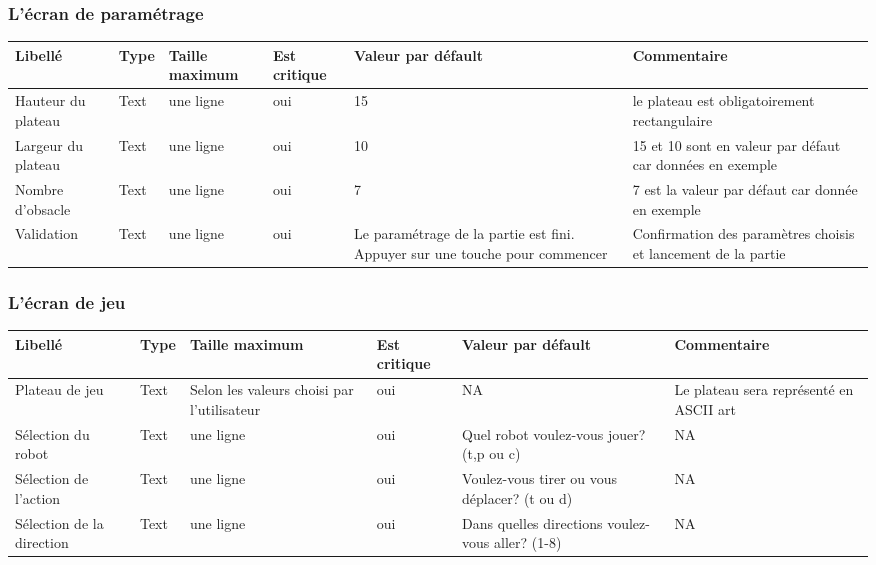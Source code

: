 \documentclass[12pt,a4paper]{article}
\begin{document}
		\subsubsection{L'écran de paramétrage}
				\hspace{-3cm}
				\begin{tabular}{|p{2.5cm}|p{1.5cm}|p{3cm}|p{2.5cm}|p{3cm}|p{3.5cm}|} %
					\hline
						Libellé & Type & Taille maximum & Est critique & Valeur par défault & Commentaire \\
					\hline \hline
						Hauteur du plateau & Text & une ligne & oui & 15 & le plateau est obligatoirement rectangulaire \\
						\hline
						Largeur du plateau & Text & une ligne & oui & 10 & 15 et 10 sont en valeur par défaut car données en exemple \\
						\hline
						Nombre d'obsacle & Text & une ligne & oui & 7 & 7 est la valeur par défaut car donnée en exemple \\
						\hline
						Validation & Text & une ligne & oui & Le paramétrage  de la partie est fini. Appuyer sur une touche pour commencer & Confirmation des paramètres choisis et lancement de la partie\\
					\hline
				\end{tabular}
				\label{Informations présentes sur l'écran de paramétrage}
			
			\subsubsection{L'écran de jeu}
				\hspace{-3cm}
				\begin{tabular}{|p{2.5cm}|p{1.5cm}|p{3cm}|p{2.2cm}|p{3.3cm}|p{3.5cm}|} %
					\hline
						Libellé & Type & Taille maximum & Est critique & Valeur par défault & Commentaire \\
					\hline \hline
						Plateau de jeu & Text & Selon les valeurs choisi par l'utilisateur & oui & NA & Le plateau sera représenté en ASCII art \\
						\hline
						Sélection du robot & Text & une ligne & oui & Quel robot voulez-vous jouer? (t,p ou c) & NA \\
						\hline
						Sélection de l'action & Text & une ligne & oui & Voulez-vous tirer ou vous déplacer? (t ou d) &  NA \\
						\hline
						Sélection de la direction & Text & une ligne & oui & Dans quelles directions voulez-vous aller? (1-8) & NA\\
					\hline
				\end{tabular}
				\label{Informations présentes sur l'écran de jeu}
			
\end{document}

